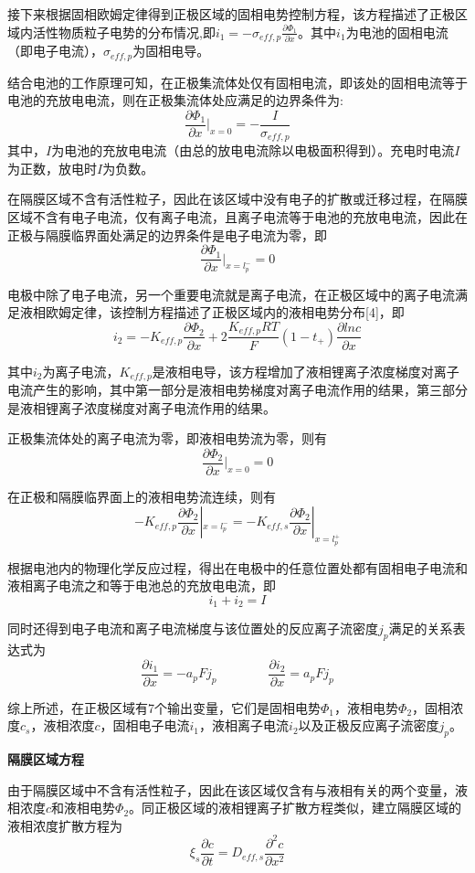 \documentclass[12pt]{ctexart}%
\begin{document}
接下来根据固相欧姆定律得到正极区域的固相电势控制方程，该方程描述了正极区域内活性物质粒子电势的分布情况,即$i_1 = -\sigma_{eff,p}\frac{\partial \Phi_1}{\partial x}$。其中$i_1$为电池的固相电流（即电子电流），$\sigma_{eff,p}$为固相电导。

结合电池的工作原理可知，在正极集流体处仅有固相电流，即该处的固相电流等于电池的充放电电流，则在正极集流体处应满足的边界条件为:
$$\frac{\partial \Phi_1}{\partial x}|_{x=0} = -\frac{I}{\sigma_{eff,p}}$$
其中，$I$为电池的充放电电流（由总的放电电流除以电极面积得到）。充电时电流$I$为正数，放电时$I$为负数。

在隔膜区域不含有活性粒子，因此在该区域中没有电子的扩散或迁移过程，在隔膜区域不含有电子电流，仅有离子电流，且离子电流等于电池的充放电电流，因此在正极与隔膜临界面处满足的边界条件是电子电流为零，即
$$\frac{\partial \Phi_1}{\partial x}|_{x=l_p^-} = 0$$

电极中除了电子电流，另一个重要电流就是离子电流，在正极区域中的离子电流满足液相欧姆定律，该控制方程描述了正极区域内的液相电势分布[4]，即
$$i_2 = -K_{eff,p}\frac{\partial \Phi_2}{\partial x} + 2\frac{K_{eff,p}RT}{F}(1-t_+)\frac{\partial ln c}{\partial x}$$

其中$i_2$为离子电流，$K_{eff,p}$是液相电导，该方程增加了液相锂离子浓度梯度对离子电流产生的影响，其中第一部分是液相电势梯度对离子电流作用的结果，第三部分是液相锂离子浓度梯度对离子电流作用的结果。

正极集流体处的离子电流为零，即液相电势流为零，则有
$$\frac{\partial \Phi_2}{\partial x}|_{x=0} = 0$$

在正极和隔膜临界面上的液相电势流连续，则有
$$-K_{eff,p}\frac{\partial \Phi_2}{\partial x}|_{x=l^-_p} = -K_{eff,s}\frac{\partial \Phi_2}{\partial x}|_{x=l^+_p}$$

根据电池内的物理化学反应过程，得出在电极中的任意位置处都有固相电子电流和液相离子电流之和等于电池总的充放电电流，即
$$i_1+i_2=I$$

同时还得到电子电流和离子电流梯度与该位置处的反应离子流密度$j_p$满足的关系表达式为
$$\frac{\partial i_1}{\partial x} = -a_pFj_p \qquad \qquad     \frac{\partial i_2}{\partial x} = a_pFj_p$$

综上所述，在正极区域有7个输出变量，它们是固相电势$\Phi_1$，液相电势$\Phi_2$，固相浓度$c_s$，液相浓度$c$，固相电子电流$i_1$，液相离子电流$i_2$以及正极反应离子流密度$j_p$\cite{Diwakar2009TowardsEM}。

\noindent\textbf{隔膜区域方程}

由于隔膜区域中不含有活性粒子，因此在该区域仅含有与液相有关的两个变量，液相浓度$c$和液相电势$\Phi_2$。同正极区域的液相锂离子扩散方程类似，建立隔膜区域的液相浓度扩散方程为
$$\xi_s\frac{\partial c}{\partial t} = D_{eff,s}\frac{\partial^2 c}{\partial x^2}$$
\end{document}
